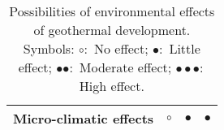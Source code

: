 \documentclass[12pts,a4paper,amsmath,amssymb,floatfix]{article}%
\begin{document}
\begin{enumerate}[label=\bfseries Problem \arabic*:]
\begin{table}[h]
\begin{center}
\begin{tabular}{l | l | l | l }
    Micro-climatic effects             & $\circ$              & $\bullet$                    & $\bullet$                \\
    \hline
    \hline
  \end{tabular}
\end{center}
  \caption{Possibilities of environmental effects of geothermal development. Symbols: $\circ:$ No effect; $\bullet:$ Little effect; $\bullet\bullet:$ Moderate effect; $\bullet\bullet\bullet:$ High effect.}
\label{table:EnvironmentalImpact}
\end{table}



%
\end{enumerate}



\clearpage

{

}
\end{document}
